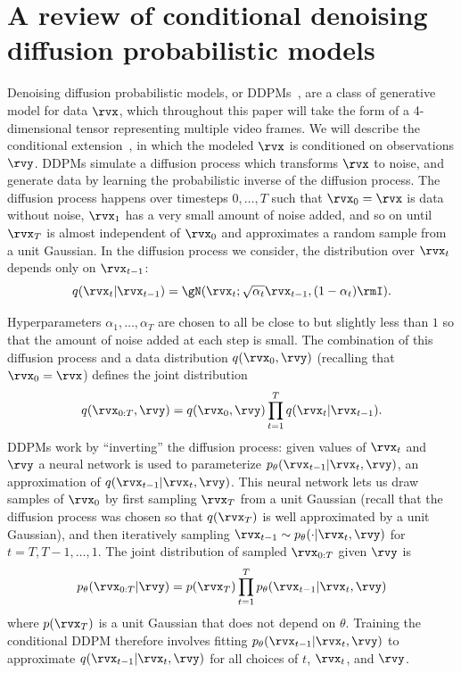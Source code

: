 \section{A review of conditional denoising diffusion probabilistic models} \label{sec:ddpm}
Denoising diffusion probabilistic models, or DDPMs~\citep{sohl2015deep,ho2020denoising,nichol2021improved,song2020score}, are a class of generative model for data $\rvx$, which throughout this paper will take the form of a 4-dimensional tensor representing multiple video frames. We will describe the conditional extension~\citep{tashiro2021csdi}, in which the modeled $\rvx$ is conditioned on observations $\rvy$. DDPMs simulate a diffusion process which transforms $\rvx$ to noise, and generate data by learning the probabilistic inverse of the diffusion process. The diffusion process happens over timesteps $0,\ldots,T$ such that $\rvx_0=\rvx$ is data without noise, $\rvx_1$ has a very small amount of noise added, and so on until $\rvx_T$ is almost independent of $\rvx_0$ and approximates a random sample from a unit Gaussian. In the diffusion process we consider, the distribution over $\rvx_t$ depends only on $\rvx_{t-1}$:
\begin{equation} \label{eq:q-step}
    q(\rvx_t | \rvx_{t-1}) = \gN(\rvx_t ; \sqrt{\alpha_t}  \rvx_{t-1} , (1-\alpha_t) \rmI ).
\end{equation}

Hyperparameters $\alpha_1,\ldots,\alpha_T$ are chosen to all be close to but slightly less than $1$ so that the amount of noise added at each step is small.
The combination of this diffusion process and a data distribution $q(\rvx_0,\rvy)$ (recalling that $\rvx_0=\rvx$) defines the joint distribution
\begin{equation} \label{eq:q-joint}
    q(\rvx_{0:T}, \rvy) = q(\rvx_0, \rvy) \prod_{t=1}^T q(\rvx_t|\rvx_{t-1}).
\end{equation}
DDPMs work by ``inverting'' the diffusion process: given values of $\rvx_t$ and $\rvy$ a neural network is used to parameterize $p_\theta(\rvx_{t-1}|\rvx_t, \rvy)$, an approximation of $q(\rvx_{t-1}|\rvx_t,\rvy)$. This neural network lets us draw samples of $\rvx_0$ by first sampling $\rvx_T$ from a unit Gaussian (recall that the diffusion process was chosen so that $q(\rvx_T)$ is well approximated by a unit Gaussian), and then iteratively sampling $\rvx_{t-1} \sim p_\theta(\cdot|\rvx_t,\rvy)$ for $t=T,T-1,\ldots,1$. The joint distribution of sampled $\rvx_{0:T}$ given $\rvy$ is
\begin{equation} \label{eq:p-joint}
    p_\theta(\rvx_{0:T}|\rvy) = p(\rvx_{T}) \prod_{t=1}^T p_\theta(\rvx_{t-1}|\rvx_t, \rvy)
\end{equation}
where $p(\rvx_{T})$ is a unit Gaussian that does not depend on $\theta$. Training the conditional DDPM therefore involves fitting $p_\theta(\rvx_{t-1}|\rvx_t,\rvy)$ to approximate $q(\rvx_{t-1}|\rvx_t, \rvy)$ for all choices of $t$, $\rvx_t$, and $\rvy$.


